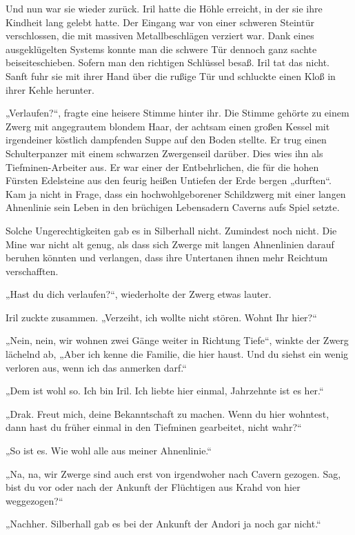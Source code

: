 Und nun war sie wieder zurück. Iril hatte die Höhle erreicht, in der sie ihre Kindheit lang gelebt hatte. Der Eingang war von einer schweren Steintür verschlossen, die mit massiven Metallbeschlägen verziert war. Dank eines ausgeklügelten Systems konnte man die schwere Tür dennoch ganz sachte beiseiteschieben. Sofern man den richtigen Schlüssel besaß. Iril tat das nicht. Sanft fuhr sie mit ihrer Hand über die rußige Tür und schluckte einen Kloß in ihrer Kehle herunter.

„Verlaufen?“, fragte eine heisere Stimme hinter ihr. Die Stimme gehörte zu einem Zwerg mit angegrautem blondem Haar, der achtsam einen großen Kessel mit irgendeiner köstlich dampfenden Suppe auf den Boden stellte. Er trug einen Schulterpanzer mit einem schwarzen Zwergenseil darüber. Dies wies ihn als Tiefminen-Arbeiter aus. Er war einer der Entbehrlichen, die für die hohen Fürsten Edelsteine aus den feurig heißen Untiefen der Erde bergen „durften“. Kam ja nicht in Frage, dass ein hochwohlgeborener Schildzwerg mit einer langen Ahnenlinie sein Leben in den brüchigen Lebensadern Caverns aufs Spiel setzte.

Solche Ungerechtigkeiten gab es in Silberhall nicht. Zumindest noch nicht. Die Mine war nicht alt genug, als dass sich Zwerge mit langen Ahnenlinien darauf beruhen könnten und verlangen, dass ihre Untertanen ihnen mehr Reichtum verschafften.

„Hast du dich verlaufen?“, wiederholte der Zwerg etwas lauter.

Iril zuckte zusammen. „Verzeiht, ich wollte nicht stören. Wohnt Ihr hier?“

„Nein, nein, wir wohnen zwei Gänge weiter in Richtung Tiefe“, winkte der Zwerg lächelnd ab, „Aber ich kenne die Familie, die hier haust. Und du siehst ein wenig verloren aus, wenn ich das anmerken darf.“

„Dem ist wohl so. Ich bin Iril. Ich liebte hier einmal, Jahrzehnte ist es her.“

„Drak. Freut mich, deine Bekanntschaft zu machen. Wenn du hier wohntest, dann hast du früher einmal in den Tiefminen gearbeitet, nicht wahr?“

„So ist es. Wie wohl alle aus meiner Ahnenlinie.“

„Na, na, wir Zwerge sind auch erst von irgendwoher nach Cavern gezogen. Sag, bist du vor oder nach der Ankunft der Flüchtigen aus Krahd von hier weggezogen?“

„Nachher. Silberhall gab es bei der Ankunft der Andori ja noch gar nicht.“

